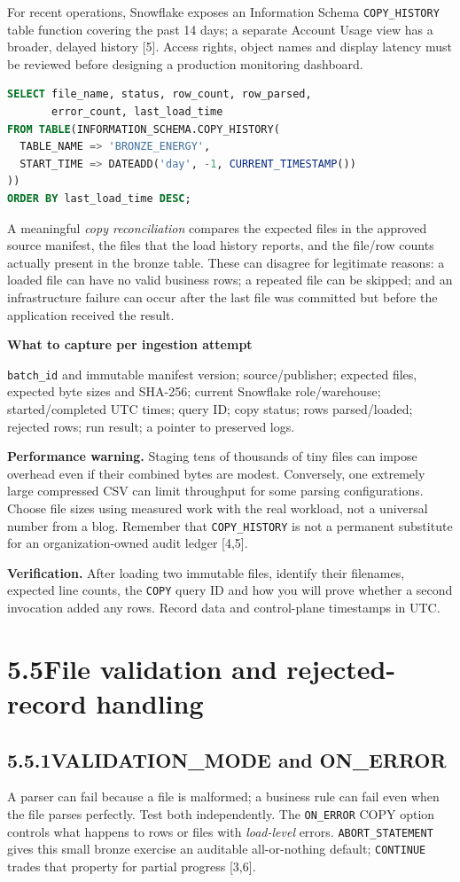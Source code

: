 \documentclass[11pt,twoside]{article}
\newcommand{\topic}[2]{\subsection*{#1\quad #2}}
\begin{document}
For recent operations, Snowflake exposes an Information Schema \texttt{COPY\_HISTORY} table function covering the past 14 days; a separate Account Usage view has a broader, delayed history [5]. Access rights, object names and display latency must be reviewed before designing a production monitoring dashboard.

\begin{lstlisting}[language=SQL,caption={Investigate recently processed files; example scope.}]
SELECT file_name, status, row_count, row_parsed,
       error_count, last_load_time
FROM TABLE(INFORMATION_SCHEMA.COPY_HISTORY(
  TABLE_NAME => 'BRONZE_ENERGY',
  START_TIME => DATEADD('day', -1, CURRENT_TIMESTAMP())
))
ORDER BY last_load_time DESC;
\end{lstlisting}
A meaningful \emph{copy reconciliation} compares the expected files in the approved source manifest, the files that the load history reports, and the file/row counts actually present in the bronze table. These can disagree for legitimate reasons: a loaded file can have no valid business rows; a repeated file can be skipped; and an infrastructure failure can occur after the last file was committed but before the application received the result.

\begin{whitebox}\textbf{What to capture per ingestion attempt}\par
\texttt{batch\_id} and immutable manifest version; source/publisher; expected files, expected byte sizes and SHA-256; current Snowflake role/warehouse; started/completed UTC times; query ID; copy status; rows parsed/loaded; rejected rows; run result; a pointer to preserved logs.\end{whitebox}
\textbf{Performance warning.} Staging tens of thousands of tiny files can impose overhead even if their combined bytes are modest. Conversely, one extremely large compressed CSV can limit throughput for some parsing configurations. Choose file sizes using measured work with the real workload, not a universal number from a blog. Remember that \texttt{COPY\_HISTORY} is not a permanent substitute for an organization-owned audit ledger [4,5].

\textbf{Verification.} After loading two immutable files, identify their filenames, expected line counts, the \texttt{COPY} query ID and how you will prove whether a second invocation added any rows. Record data and control-plane timestamps in UTC.
\newpage
\section*{5.5\quad File validation and rejected-record handling}
\topic{5.5.1}{VALIDATION\_MODE and ON\_ERROR}
A parser can fail because a file is malformed; a business rule can fail even when the file parses perfectly. Test both independently. The \texttt{ON\_ERROR} COPY option controls what happens to rows or files with \emph{load-level} errors. \texttt{ABORT\_STATEMENT} gives this small bronze exercise an auditable all-or-nothing default; \texttt{CONTINUE} trades that property for partial progress [3,6].
\end{document}
